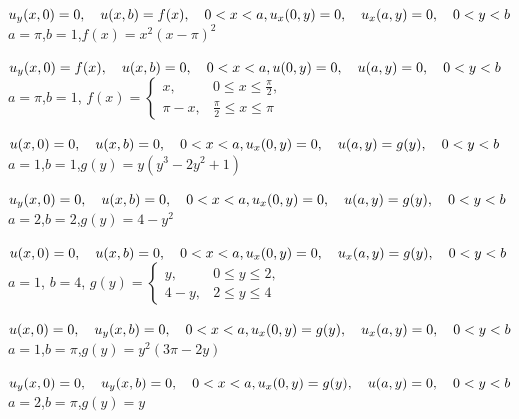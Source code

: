 \begin{exerciselist}
\item\label{exer:12.3.22}$u_y(x,0)=0,\quad u(x,b)=f(x),\quad 0<x<a,\\
u_x(0,y)=0,\quad u_x(a,y)=0,\quad 0<y<b$  \\
$a=\pi$,\quad $b=1$,\quad $f(x)=x^2(x-\pi)^2$

\item\label{exer:12.3.23}\Cex
$u_y(x,0)=f(x),\quad u(x,b)=0,\quad 0<x<a,\\
u(0,y)=0,\quad u(a,y)=0,\quad 0<y<b$  \\
$a=\pi$,\quad  $b=1$,\quad
$f(x)=
\begin{cases}
x,&0\le x\le\frac{\pi}{2},\\\pi-x,&\frac{\pi}{2}\le x\le \pi
\end{cases}$

\item\label{exer:12.3.24}$u(x,0)=0,\quad u(x,b)=0,\quad 0<x<a,\\
u_x(0,y)=0,\quad u(a,y)=g(y),\quad 0<y<b$  \\
$a=1$,\quad $b=1$,\quad $g(y)=y(y^3-2y^2+1)$

\item\label{exer:12.3.25}\Cex
$u_y(x,0)=0,\quad u(x,b)=0,\quad 0<x<a,\\
u_x(0,y)=0,\quad u(a,y)=g(y),\quad 0<y<b$  \\
$a=2$,\quad $b=2$,\quad $g(y)=4-y^2$

\item\label{exer:12.3.26}$u(x,0)=0,\quad u(x,b)=0,\quad 0<x<a,\\
u_x(0,y)=0,\quad u_x(a,y)=g(y),\quad 0<y<b$  \\
$a=1$, $b=4$,
$g(y)=
\begin{cases}
y,&0\le y\le2,\\4-y,&2\le y\le 4
\end{cases}$

\item\label{exer:12.3.27}$u(x,0)=0,\quad u_y(x,b)=0,\quad 0<x<a,\\
u_x(0,y)=g(y),\quad u_x(a,y)=0,\quad 0<y<b$  \\
$a=1$,\quad  $b=\pi$,\quad $g(y)=y^2(3\pi-2y)$

\item\label{exer:12.3.28}$u_y(x,0)=0,\quad u_y(x,b)=0,\quad 0<x<a,\\
u_x(0,y)=g(y),\quad u(a,y)=0,\quad 0<y<b$  \\
$a=2$,\quad $b=\pi$,\quad $g(y)=y$



\end{exerciselist}
